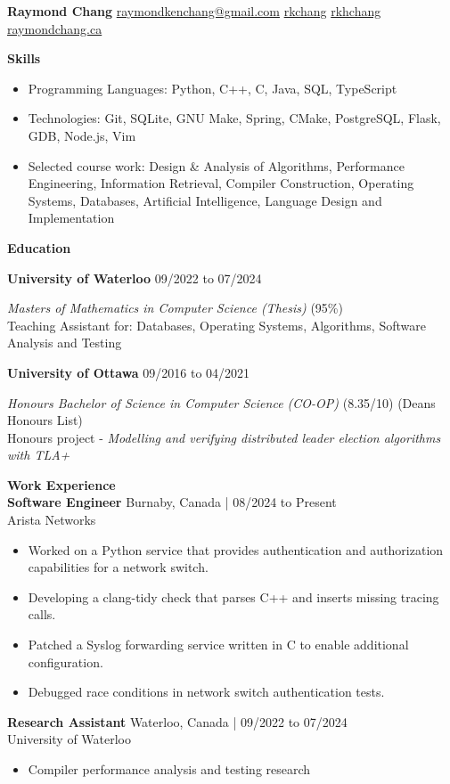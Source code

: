 \documentclass[10pt]{article}
\begin{document}
{\huge\textbf{Raymond Chang}} \space\space
{} \href{mailto:raymondkenchang@gmail.com}{raymondkenchang@gmail.com}  \space\space
{} \href{https://github.com/rkchang}{rkchang} \space\space
{} \href{https://linkedin.com/in/rkhchang}{rkhchang} \space\space
{} \href{https://raymondchang.ca/}{raymondchang.ca}

\bigskip

{\Large\textbf{Skills}}\space \hrulefill
\begin{itemize}
    \item Programming Languages: Python, C++, C, Java, SQL, TypeScript
    \item Technologies: Git, SQLite, GNU Make, Spring, CMake, PostgreSQL, Flask, GDB, Node.js, Vim
    \item Selected course work: Design \& Analysis of Algorithms, Performance Engineering, Information Retrieval, Compiler Construction, Operating Systems, Databases, Artificial Intelligence, Language Design and Implementation
\end{itemize}

\smallskip

{\Large\textbf{Education}}\space \hrulefill

\textbf{University of Waterloo} \hfill  09/2022 to 07/2024

\textit{Masters of Mathematics in Computer Science (Thesis)} (95\%) \\
Teaching Assistant for: Databases, Operating Systems, Algorithms, Software Analysis and Testing

\textbf{University of Ottawa} \hfill 09/2016 to 04/2021

\textit{Honours Bachelor of Science in Computer Science (CO-OP)} (8.35/10) (Deans Honours List) \\
Honours project - \textit{Modelling and verifying distributed leader election algorithms with TLA+}

\smallskip

{\Large\textbf{Work Experience}}\space \hrulefill \\
\textbf{Software Engineer} \hfill Burnaby, Canada | 08/2024 to Present \\
Arista Networks
\begin{itemize}
    \item Worked on a Python service that provides authentication and authorization capabilities for a network switch.
    \item Developing a clang-tidy check that parses C++ and inserts missing tracing calls.
    \item Patched a Syslog forwarding service written in C to enable additional configuration.
    \item Debugged race conditions in network switch authentication tests.
\end{itemize}
\textbf{Research Assistant} \hfill Waterloo, Canada | 09/2022 to 07/2024 \\
University of Waterloo
\begin{itemize}
    \item Compiler performance analysis and testing research
\end{itemize}
\end{document}
